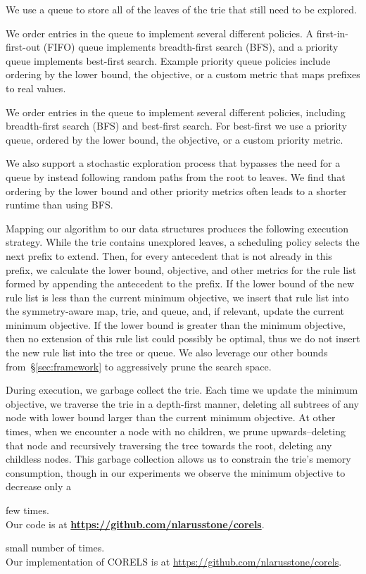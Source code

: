 We use a queue to store all of the leaves of the trie that still need to be explored.
%
\begin{arxiv}
We order entries in the queue to implement several different policies.
%
A first-in-first-out (FIFO) queue implements breadth-first search (BFS),
and a priority queue implements best-first search.
%
Example priority queue policies include ordering
by the lower bound, the objective, or a custom metric
that maps prefixes to real values.
\end{arxiv}
\begin{kdd}
We order entries in the queue to implement several different policies,
including breadth-first search (BFS) and best-first search.
%
For best-first we use a priority queue, ordered by the lower bound, the objective,
or a custom priority metric.
\end{kdd}
%
We also support a stochastic exploration process that bypasses
the need for a queue by instead following random paths from the root to leaves.
%
We find that ordering by the lower bound and other priority metrics
often leads to a shorter runtime than using BFS.


Mapping our algorithm to our data structures produces the following execution strategy.
%
While the trie contains unexplored leaves, a scheduling policy selects the next prefix to extend.
%
Then, for every antecedent that is not already in this prefix, we calculate the lower bound,
objective, and other metrics for the rule list formed by appending the antecedent to the prefix.
%
If the lower bound of the new rule list is less than the current minimum objective, we insert that
rule list into the symmetry-aware map, trie, and queue, and, if relevant, update the
current minimum objective.
%
If the lower bound is greater than the minimum objective,
then no extension of this rule list could possibly be optimal,
thus we do not insert the new rule list into the tree or queue.
%
We also leverage our other bounds from~\S\ref{sec:framework}
to aggressively prune the search space.

During execution, we garbage collect the trie.
%
Each time we update the minimum objective,
we traverse the trie in a depth-first manner, deleting all subtrees
of any node with lower bound larger than the current minimum objective.
%
At other times, when we encounter a node with no children, we prune upwards--deleting that
node and recursively traversing the tree towards the root, deleting any childless nodes.
%
This garbage collection allows us to constrain the trie's memory consumption, though in our
experiments we observe the minimum objective to decrease only a
\begin{kdd}
few times. \\

Our code is at \textbf{\url{https://github.com/nlarusstone/corels}}.
\end{kdd}
\begin{arxiv}
small number of times. \\

Our implementation of CORELS is at \url{https://github.com/nlarusstone/corels}.
\end{arxiv}

